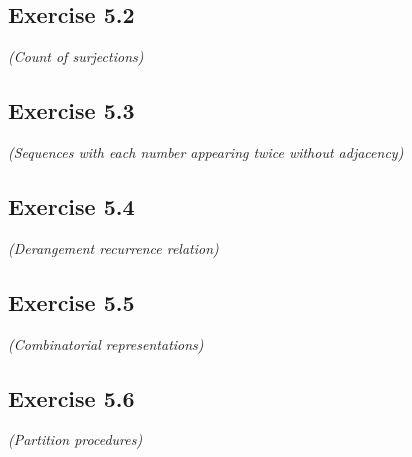 \documentclass[12pt,a4paper]{article}
\begin{document}
\subsection*{Exercise 5.2}
\textit{(Count of surjections)}

\vspace{1cm}

\subsection*{Exercise 5.3}
\textit{(Sequences with each number appearing twice without adjacency)}

\vspace{1cm}

\subsection*{Exercise 5.4}
\textit{(Derangement recurrence relation)}

\vspace{1cm}

\subsection*{Exercise 5.5}
\textit{(Combinatorial representations)}

\vspace{1cm}

\subsection*{Exercise 5.6}
\textit{(Partition procedures)}

\vspace{1cm}
\end{document}
